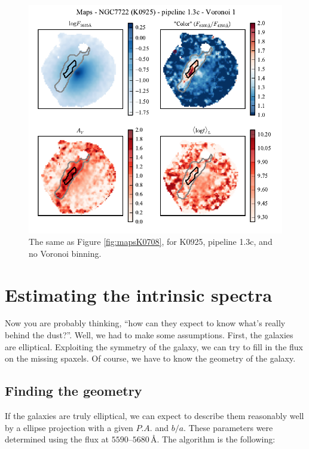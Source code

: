 \documentclass[a4paper]{article}
\newcommand{\angstrom}{\text{\AA}}
\begin{document}
\begin{figure}
\includegraphics{figures/maps_K0925_1.3c_v01.pdf}

\caption{The same as Figure \ref{fig:mapsK0708}, for K0925, pipeline 1.3c, and
no Voronoi binning.}
\label{fig:mapsK0925}
\end{figure}


\section{Estimating the intrinsic spectra}

Now you are probably thinking, ``how can they expect to know what's really
behind the dust?''. Well, we had to make some assumptions. First, the galaxies
are elliptical. Exploiting the symmetry of the galaxy, we can try to fill in the
flux on the missing spaxels. Of course, we have to know the geometry of the
galaxy.

\subsection{Finding the geometry}
\label{sec:geometry}

If the galaxies are truly elliptical, we can expect to describe them reasonably
well by a ellipse projection with a given $P.A.$ and $b/a$. These parameters
were determined using the flux at $5590$--$5680\,\angstrom$. The algorithm is
the following:
\end{document}
